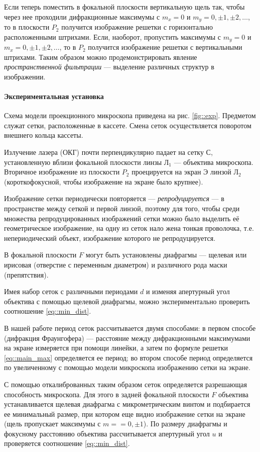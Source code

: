 \documentclass[12pt]{article}
\begin{document}
	Если теперь поместить в фокальной плоскости вертикальную щель так, чтобы
	через нее проходили дифракционные максимумы с $m_x = 0$ и
	$m_y = 0, \pm 1, \pm 2, \dots$,
	то в плоскости
	$P_2$ получится изображение
	решетки с горизонтально расположенными штрихами. Если, наоборот, пропустить
	максимумы с $m_y = 0$ и
	$m_x = 0, \pm1, \pm2, \dots$,
	то в $P_2$ получится изображение решетки
	с вертикальными штрихами.
	Таким образом можно продемонстрировать явление
	\textit{пространственной фильтрации}
	— выделение различных структур в изображении.
	
	\paragraph{Экспериментальная установка}
	Схема модели проекционного микроскопа приведена на рис. \ref{fig::exp}. Предметом служат сетки, расположенные в кассете. Смена сеток осуществляется поворотом внешнего кольца кассеты.

	Излучение лазера (ОКГ) почти перпендикулярно падает на сетку С,
	установленную вблизи фокальной плоскости линзы
	Л$_1$ — объектива микроскопа. Вторичное изображение из плоскости
	$P_2$ проецируется на экран Э линзой
	Л$_2$ (короткофокусной, чтобы изображение на экране
	было крупнее). 
	
	Изображение сетки периодически повторяется — \textit{репродуцируется} —
	в пространстве между сеткой и первой линзой, поэтому для того, чтобы среди множества репродуцированных изображений
	сетки можно было выделить её геометрическое изображение, на одну из
	сеток нало
	жена тонкая проволочка, т.е. непериодический объект, изображение
	которого не репродуцируется.
	
	В фокальной плоскости $F$ могут быть
	установлены диафрагмы — щелевая или ирисовая (отверстие с переменным диаметром)
	и различного рода маски (препятствия).
	
	Имея набор сеток с
	различными периодами
	$d$
	и изменяя апертурный угол объектива с помощью щелевой диафрагмы, можно экспериментально проверить соотношение \eqref{eq::min_dist}.
	
	В нашей работе период сеток рассчитывается двумя способами: в первом способе (дифракция Фраунгофера) — расстояние между дифракционными максимумами на экране измеряется при помощи линейки, а затем по формуле решетки \eqref{eq::main_max} определяется ее период; во втором способе
	период определяется по увеличенному с помощью модели микроскопа
	изображению сетки на экране.
	
	С помощью откалиброванных таким образом сеток определяется разрешающая способность микроскопа. Для этого в задней фокальной плоскости
	$F$ объектива устанавливается щелевая диафрагма с микрометрическим винтом
	и подбирается ее минимальный размер, при
	котором еще	видно изображение сетки на экране (щель пропускает максимумы с $m =
	= 0, \pm1$). По размеру диафрагмы
	и фокусному расстоянию объектива
	рассчитывается апертурный угол
	$u$
	и проверяется соотношение \eqref{eq::min_dist}.
	
\end{document}
